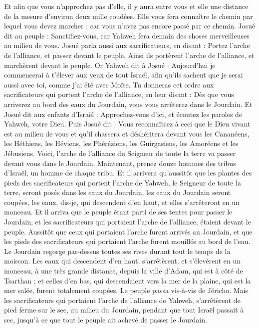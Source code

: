 \begin{multicols}{2}
Et afin que vous n'approchez pas d'elle, il y aura entre vous et elle une distance de la mesure d'environ deux mille coudées. Elle vous fera connaître le chemin par lequel vous devez marcher ; car vous n'avez pas encore passé par ce chemin.
Josué dit au peuple : Sanctifiez-vous, car Yahweh fera demain des choses merveilleuses au milieu de vous.
Josué parla aussi aux sacrificateurs, en disant : Portez l'arche de l'alliance, et passez devant le peuple. Ainsi ils portèrent l'arche de l'alliance, et marchèrent devant le peuple.
Or Yahweh dit à Josué : Aujourd'hui je commencerai à t'élever aux yeux de tout Israël, afin qu'ils sachent que je serai aussi avec toi, comme j'ai été avec Moïse.
Tu donneras cet ordre aux sacrificateurs qui portent l'arche de l'alliance, en leur disant : Dès que vous arriverez au bord des eaux du Jourdain, vous vous arrêterez dans le Jourdain.
Et Josué dit aux enfants d'Israël : Approchez-vous d'ici, et écoutez les paroles de Yahweh, votre Dieu.
Puis Josué dit : Vous reconnaîtrez à ceci que le Dieu vivant est au milieu de vous et qu'il chassera et déshéritera devant vous les Cananéens, les Héthiens, les Héviens, les Phéréziens, les Guirgasiens, les Amoréens et les Jébusiens.
Voici, l'arche de l'alliance du Seigneur de toute la terre va passer devant vous dans le Jourdain.
Maintenant, prenez douze hommes des tribus d'Israël, un homme de chaque tribu.
Et il arrivera qu'aussitôt que les plantes des pieds des sacrificateurs qui portent l'arche de Yahweh, le Seigneur de toute la terre, seront posés dans les eaux du Jourdain, les eaux du Jourdain seront coupées, les eaux, dis-je, qui descendent d'en haut, et elles s'arrêteront en un monceau.
Et il arriva que le peuple étant parti de ses tentes pour passer le Jourdain, et les sacrificateurs qui portaient l'arche de l'alliance, étaient devant le peuple.
Aussitôt que ceux qui portaient l'arche furent arrivés au Jourdain, et que les pieds des sacrificateurs qui portaient l'arche furent mouillés au bord de l'eau. Le Jourdain regorge par-dessus toutes ses rives durant tout le temps de la moisson.
Les eaux qui descendent d'en haut, s'arrêtèrent, et s'élevèrent en un monceau, à une très grande distance, depuis la ville d'Adam, qui est à côté de Tsarthan ; et celles d'en bas, qui descendaient vers la mer de la plaine, qui est la mer salée, furent totalement coupées. Le peuple passa vis-à-vis de Jéricho.
Mais les sacrificateurs qui portaient l'arche de l'alliance de Yahweh, s'arrêtèrent de pied ferme sur le sec, au milieu du Jourdain, pendant que tout Israël passait à sec, jusqu'à ce que tout le peuple ait achevé de passer le Jourdain.

\end{multicols}
